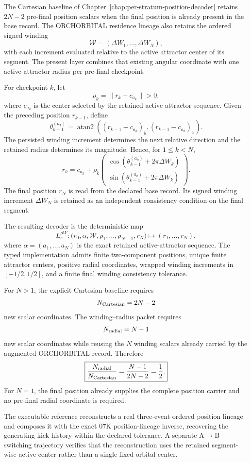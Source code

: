 \documentclass[11pt]{book}
\begin{document}
The Cartesian baseline of Chapter~\ref{chap:per-stratum-position-decoder} retains $2N-2$ pre-final position scalars when the final position is already present in the base record. The ORCHORBITAL residence lineage also retains the ordered signed winding
\[
\mathcal W=(\Delta W_1,\ldots,\Delta W_N),
\]
with each increment evaluated relative to the active attractor center of its segment. The present layer combines that existing angular coordinate with one active-attractor radius per pre-final checkpoint.

For checkpoint $k$, let
\[
\rho_k=\|r_k-c_{a_k}\|>0,
\]
where $c_{a_k}$ is the center selected by the retained active-attractor sequence. Given the preceding position $r_{k-1}$, define
\[
\theta_{k-1}^{(a_k)}
=\operatorname{atan2}\!\left(
(r_{k-1}-c_{a_k})_y,
(r_{k-1}-c_{a_k})_x
\right).
\]
The persisted winding increment determines the next relative direction and the retained radius determines its magnitude. Hence, for $1\le k<N$,
\[
\boxed{
r_k=c_{a_k}+\rho_k
\begin{pmatrix}
\cos\!\left(\theta_{k-1}^{(a_k)}+2\pi\Delta W_k\right)\\
\sin\!\left(\theta_{k-1}^{(a_k)}+2\pi\Delta W_k\right)
\end{pmatrix}.
}
\]
The final position $r_N$ is read from the declared base record. Its signed winding increment $\Delta W_N$ is retained as an independent consistency condition on the final segment.

The resulting decoder is the deterministic map
\[
\boxed{
L_s^{\rho W}:
\bigl(r_0,\alpha,\mathcal W,\rho_1,\ldots,\rho_{N-1},r_N\bigr)
\longmapsto
(r_1,\ldots,r_N),
}
\]
where $\alpha=(a_1,\ldots,a_N)$ is the exact retained active-attractor sequence. The typed implementation admits finite two-component positions, unique finite attractor centers, positive radial coordinates, wrapped winding increments in $[-1/2,1/2]$, and a finite final winding consistency tolerance.

For $N>1$, the explicit Cartesian baseline requires
\[
N_{\rm Cartesian}=2N-2
\]
new scalar coordinates. The winding--radius packet requires
\[
N_{\rm radial}=N-1
\]
new scalar coordinates while reusing the $N$ winding scalars already carried by the augmented ORCHORBITAL record. Therefore
\[
\boxed{
\frac{N_{\rm radial}}{N_{\rm Cartesian}}
=\frac{N-1}{2N-2}
=\frac12.
}
\]
For $N=1$, the final position already supplies the complete position carrier and no pre-final radial coordinate is required.

The executable reference reconstructs a real three-event ordered position lineage and composes it with the exact 07K position-lineage inverse, recovering the generating kick history within the declared tolerance. A separate A$\to$B switching trajectory verifies that the reconstruction uses the retained segment-wise active center rather than a single fixed orbital center.
\end{document}

